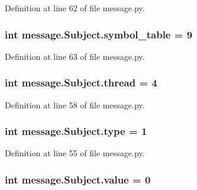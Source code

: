 Definition at line 62 of file message.\+py.

\hypertarget{classmessage_1_1Subject_a948474a595d3751ff94e13e23294530f}{}
\subsubsection[{symbol\+\_\+table}]{\setlength{\rightskip}{0pt plus 5cm}int message.\+Subject.\+symbol\+\_\+table = 9\hspace{0.3cm}{\ttfamily [static]}}\label{classmessage_1_1Subject_a948474a595d3751ff94e13e23294530f}


Definition at line 63 of file message.\+py.

\hypertarget{classmessage_1_1Subject_a015050d4a3a3e25a73d64ab2061fedbb}{}
\subsubsection[{thread}]{\setlength{\rightskip}{0pt plus 5cm}int message.\+Subject.\+thread = 4\hspace{0.3cm}{\ttfamily [static]}}\label{classmessage_1_1Subject_a015050d4a3a3e25a73d64ab2061fedbb}


Definition at line 58 of file message.\+py.

\hypertarget{classmessage_1_1Subject_a2513fde3e08a61b0b5c12a94181394ac}{}
\subsubsection[{type}]{\setlength{\rightskip}{0pt plus 5cm}int message.\+Subject.\+type = 1\hspace{0.3cm}{\ttfamily [static]}}\label{classmessage_1_1Subject_a2513fde3e08a61b0b5c12a94181394ac}


Definition at line 55 of file message.\+py.

\hypertarget{classmessage_1_1Subject_afbe000d791d41953a866b13c8e75c356}{}
\subsubsection[{value}]{\setlength{\rightskip}{0pt plus 5cm}int message.\+Subject.\+value = 0\hspace{0.3cm}{\ttfamily [static]}}\label{classmessage_1_1Subject_afbe000d791d41953a866b13c8e75c356}



